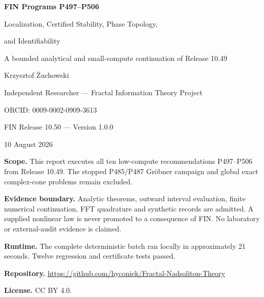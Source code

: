 \documentclass[11pt,a4paper]{article}
\theoremstyle{definition}
\theoremstyle{remark}
\begin{document}
\hypersetup{pageanchor=false}

\begin{titlepage}
\centering
\vspace*{15mm}
{\Huge\bfseries FIN Programs P497--P506\par}
\vspace{5mm}
{\Large Localization, Certified Stability, Phase Topology,\par}
{\Large and Identifiability\par}
\vspace{4mm}
{\large A bounded analytical and small-compute continuation of Release 10.49\par}
\vspace{15mm}
{\Large Krzysztof Żuchowski\par}
\vspace{2mm}
{\normalsize Independent Researcher --- Fractal Information Theory Project\par}
{\normalsize ORCID: 0009-0002-0909-3613\par}
\vspace{10mm}
{\large FIN Release 10.50 --- Version 1.0.0\par}
{\large 10 August 2026\par}
\vfill
\begin{minipage}{0.90\textwidth}
\small
\textbf{Scope.} This report executes all ten low-compute recommendations P497--P506 from Release 10.49. The stopped P485/P487 Gröbner campaign and global exact complex-cone problems remain excluded.

\medskip
\textbf{Evidence boundary.} Analytic theorems, outward interval evaluation, finite numerical continuation, FFT quadrature and synthetic records are admitted. A supplied nonlinear law is never promoted to a consequence of FIN. No laboratory or external-audit evidence is claimed.

\medskip
\textbf{Runtime.} The complete deterministic batch ran locally in approximately 21 seconds. Twelve regression and certificate tests passed.

\medskip
\textbf{Repository.} \url{https://github.com/hyconiek/Fractal-Nadsoliton-Theory}

\textbf{License.} CC BY 4.0.
\end{minipage}
\vfill
\end{titlepage}
\hypersetup{pageanchor=true}
\end{document}
